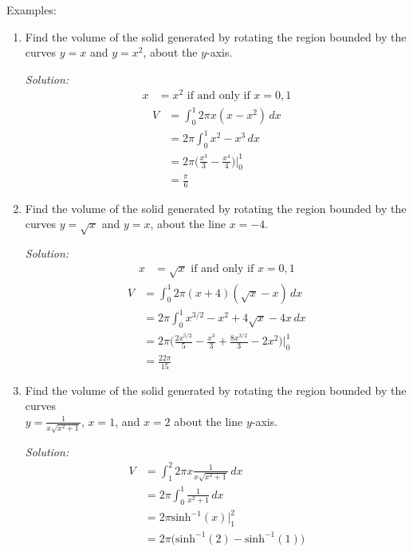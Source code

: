 \documentclass[16pt]{article}
\theoremstyle{remark}
\begin{document}
Examples:
\begin{enumerate}
\item Find the volume of the solid generated by rotating the region bounded by the curves $y=x$ and $y=x^2$, about the $y$-axis.
\begin{mdframed}[style=TheoremFrame]
\textit{Solution:}
\begin{align*}
x&=x^2 \text{ if and only if } x=0,1
\end{align*}
\begin{align*}
V&= \int_0^1 2 \pi x (x-x^2) \, dx\\
&= 2 \pi \int_0^1 x^2 - x^3 \, dx\\
&= 2 \pi \bigg(\frac{x^3}{3} - \frac{x^4}{4}\bigg) \bigg|_0^1\\
&= \frac{\pi}{6}
\end{align*}
\end{mdframed}
\item Find the volume of the solid generated by rotating the region bounded by the curves $y=\sqrt{x}$ and $y=x$, about the line $x=-4$.
\begin{mdframed}[style=TheoremFrame]
\textit{Solution:}
\begin{align*}
x&=\sqrt{x} \text{ if and only if } x=0,1
\end{align*}
\begin{align*}
V&= \int_0^1 2 \pi (x+4) (\sqrt{x}-x) \, dx\\
&= 2 \pi \int_0^1 x^{3/2} - x^2 + 4 \sqrt{x} - 4x \, dx\\
&= 2 \pi \bigg(\frac{2x^{5/2}}{5} - \frac{x^3}{3} + \frac{8x^{3/2}}{3}-2x^2\bigg) \bigg|_0^1\\
&= \frac{22\pi}{15}
\end{align*}
\end{mdframed}
\item Find the volume of the solid generated by rotating the region bounded by the curves\\ $\displaystyle{y=\frac{1}{x\sqrt{x^2+1}}}$, $x=1$, and $x=2$ about the line $y$-axis.
\begin{mdframed}[style=TheoremFrame]
\textit{Solution:}
\begin{align*}
V&= \int_1^2 2 \pi x \frac{1}{x\sqrt{x^2+1}} \, dx\\
&= 2\pi \int_0^1 \frac{1}{x^2+1} \, dx \\
&= 2\pi \text{sinh}^{-1}(x) \bigg|_1^2\\
&= 2\pi \big(\text{sinh}^{-1}(2)-\text{sinh}^{-1}(1)\big)
\end{align*}
\end{mdframed}


\end{enumerate}
\end{document}
